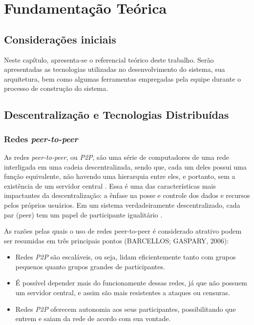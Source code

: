 \chapter[Fundamentação Teórica]{Fundamentação Teórica}
\label{cap:fundamentacao}

\section{Considerações iniciais}
Neste capítulo, apresenta-se o referencial teórico deste trabalho. Serão apresentadas as tecnologias utilizadas no desenvolvimento do sistema, sua arquitetura, bem como algumas ferramentas empregadas pela equipe durante o processo de construção do sistema.

\section{Descentralização e Tecnologias Distribuídas}
\subsection{Redes \textit{peer-to-peer}}
As redes \textit{peer-to-peer}, ou \textit{P2P}, são uma série de computadores de uma rede interligada em uma cadeia descentralizada, sendo que, cada um deles possui uma função equivalente, não havendo uma hierarquia entre eles, e portanto, sem a existência de um servidor central \cite{otton2007}. Essa é uma das características mais impactantes da descentralização: a ênfase na posse e controle dos dados e recursos pelos próprios usuários. Em um sistema verdadeiramente descentralizado, cada par (peer) tem um papel de participante igualitário \cite{oram2002}.

As razões pelas quais o uso de redes peer-to-peer é considerado atrativo podem ser resumidas em três principais pontos (BARCELLOS; GASPARY, 2006): 

\begin{itemize}
    \item Redes \textit{P2P} são escaláveis, ou seja, lidam eficientemente tanto com grupos pequenos quanto grupos grandes de participantes. 
    \item É possível depender mais do funcionamente dessas redes, já que não possuem um servidor central, e assim são mais resistentes a ataques ou censuras.
    \item Redes \textit{P2P} oferecem autonomia aos seus participantes, possibilitando que entrem e saiam da rede de acordo com sua vontade. 
\end{itemize}

